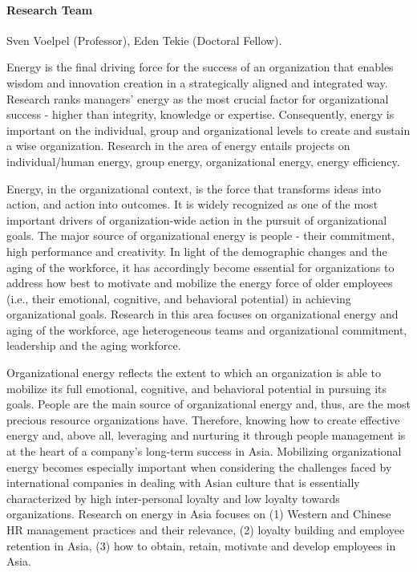 
\paragraph{Research Team}
Sven Voelpel (Professor), Eden Tekie (Doctoral Fellow).

Energy is the final driving force for the success of an organization that enables wisdom and innovation creation in a strategically aligned and integrated way. Research ranks managers' energy as the most crucial factor for organizational success - higher than integrity, knowledge or expertise. Consequently, energy is important on the individual, group and organizational levels to create and sustain a wise organization. Research in the area of energy entails projects on individual/human energy, group energy, organizational energy, energy efficiency.

Energy, in the organizational context, is the force that transforms ideas into action, and action into outcomes. It is widely recognized as one of the most important drivers of organization-wide action in the pursuit of organizational goals. The major source of organizational energy is people - their commitment, high performance and creativity. In light of the demographic changes and the aging of the workforce, it has accordingly become essential for organizations to address how best to motivate and mobilize the energy force of older employees (i.e., their emotional, cognitive, and behavioral potential) in achieving organizational goals. Research in this area focuses on organizational energy and aging of the workforce, age heterogeneous teams and organizational commitment, leadership and the aging workforce.

Organizational energy reflects the extent to which an organization is able to mobilize its full emotional, cognitive, and behavioral potential in pursuing its goals. People are the main source of organizational energy and, thus, are the most precious resource organizations have. Therefore, knowing how to create effective energy and, above all, leveraging and nurturing it through people management is at the heart of a company's long-term success in Asia. Mobilizing organizational energy becomes especially important when considering the challenges faced by international companies in dealing with Asian culture that is essentially characterized by high inter-personal loyalty and low loyalty towards organizations. Research on energy in Asia focuses on (1) Western and Chinese HR management practices and their relevance, (2) loyalty building and employee retention in Asia, (3) how to obtain, retain, motivate and develop employees in Asia. 

